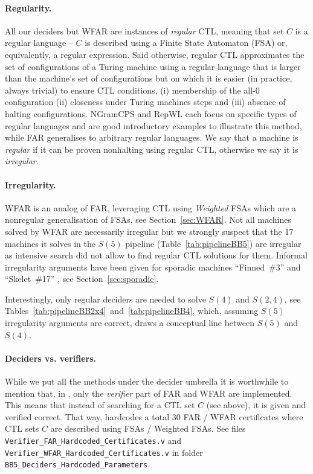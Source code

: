 \paragraph{Regularity.} All our deciders but WFAR are instances of \textit{regular} CTL, meaning that set $C$ is a regular language -- \ie $C$ is described using a Finite State Automaton (FSA) or, equivalently, a regular expression. Said otherwise, regular CTL approximates the set of configurations of a Turing machine using a regular language that is larger than the machine's set of configurations but on which it is easier (in practice, always trivial) to ensure CTL conditions, \ie (i) membership of the all-0 configuration (ii) closeness under Turing machines steps and (iii) absence of halting configurations. NGramCPS and RepWL each focus on specific types of regular languages and are good introductory examples to illustrate this method, while FAR generalises to arbitrary regular languages. We say that a machine is \textit{regular} if it can be proven nonhalting using regular CTL, otherwise we say it is \textit{irregular}.

\paragraph{Irregularity.} WFAR is an analog of FAR, leveraging CTL using \textit{Weighted} FSAs which are a nonregular generalisation of FSAs, see Section~\ref{sec:WFAR}. Not all machines solved by WFAR are necessarily irregular but we strongly suspect that the 17 machines it solves in the $S(5)$ pipeline (Table~\ref{tab:pipelineBB5}) are irregular as intensive search did not allow to find regular CTL solutions for them. Informal irregularity arguments have been given for sporadic machines ``Finned~\#3'' and ``Skelet~\#17'' \cite{irregularFinned3, irregularSk17}, see Section~\ref{sec:sporadic}.

Interestingly, only regular deciders are needed to solve $S(4)$ and $S(2,4)$, see Tables~\ref{tab:pipelineBB2x4}~and~\ref{tab:pipelineBB4}, which, assuming $S(5)$ irregularity arguments are correct, draws a conceptual line between $S(5)$ and $S(4)$.

\paragraph{Deciders vs. verifiers.} While we put all the methods under the decider umbrella it is worthwhile to mention that, in \CoqBB, only the \textit{verifier} part of FAR and WFAR are implemented. This means that instead of searching for a CTL set $C$ (see above), it is given and verified correct. That way, \CoqBB hardcodes a total $30$ FAR /
WFAR certificates where CTL sets $C$ are described using FSAs / Weighted FSAs. See files \texttt{Verifier\_FAR\_Hardcoded\_Certificates.v} and \texttt{Verifier\_WFAR\_Hardcoded\_Certificates.v} in folder \texttt{BB5\_Deciders\_Hardcoded\_Parameters}.

